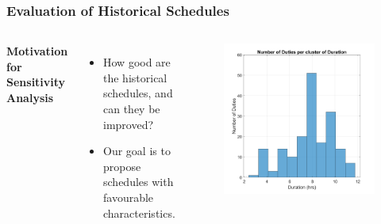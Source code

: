 \documentclass[handout]{beamer}
\begin{document}
\begin{frame}
	\frametitle{Evaluation of Historical Schedules}
	\vspace{\baselineskip}
	
	\begin{columns}[]
			\textbf{Motivation for Sensitivity Analysis}
			\begin{itemize}
				\item How good are the historical schedules, and can they be improved?
				\item Our goal is to propose schedules with favourable characteristics. 
			\end{itemize}			
			\centering
            \begin{figure}
				\includegraphics[width=\textwidth]{Images/sketo.png}
			\end{figure}

	\end{columns}
	

	

\vspace{\baselineskip}
\end{frame}

\end{document}
